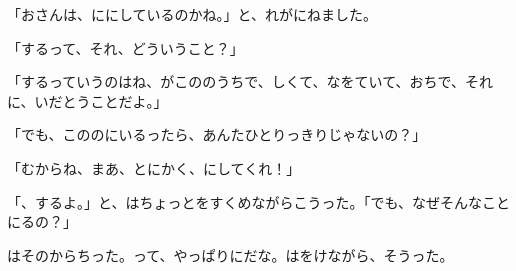 「おさんは、ににしているのかね。」と、れがにねました。

「するって、それ、どういうこと？」

「するっていうのはね、がこののうちで、しくて、なをていて、おちで、それに、いだとうことだよ。」

「でも、こののにいるったら、あんたひとりっきりじゃないの？」

「むからね、まあ、とにかく、にしてくれ！」

「、するよ。」と、はちょっとをすくめながらこうった。「でも、なぜそんなことにるの？」

はそのからちった。って、やっぱりにだな。はをけながら、そうった。


